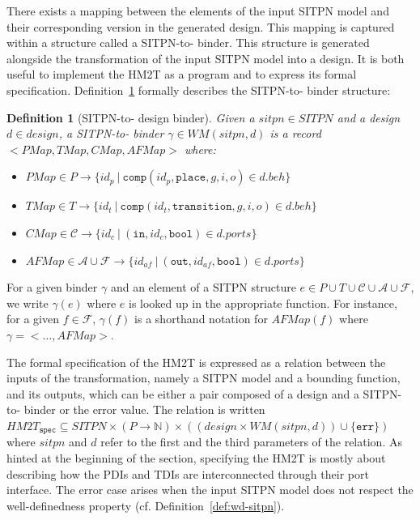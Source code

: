 \documentclass[pdflatex,sn-mathphys]{sn-jnl}%
\theoremstyle{thmstyleone}%
\theoremstyle{thmstyletwo}%
\theoremstyle{thmstylethree}%
\newtheorem{definition}{Definition}%
\begin{document}
There exists a mapping between the elements of the input SITPN model
and their corresponding version in the generated \hvhdl{} design. This
mapping is captured within a structure called a SITPN-to-\hvhdl{}
binder.  This structure is generated alongside the transformation of
the input SITPN model into a \hvhdl{} design. It is both useful to
implement the HM2T as a program and to express its formal
specification. Definition~\ref{def:sitpn-to-hvhdl-binder} formally
describes the SITPN-to-\hvhdl{} binder structure:
\begin{definition}[SITPN-to-\hvhdl{} design binder]
  \label{def:sitpn-to-hvhdl-binder}
  Given a $sitpn\in{}SITPN$ and a \hvhdl{} design $d\in{}design$, a
  SITPN-to-\hvhdl{} binder $\gamma\in{}WM(sitpn,d)$ is a record
  ${<}PMap,TMap,CMap,AFMap{>}$ where:
  \begin{itemize}
  \item $PMap\in{}P\rightarrow{}\{id_p~|~\mathtt{comp}(id_p,\mathtt{place},g,i,o)\in{}d.beh\}$
  \item $TMap\in{}T\rightarrow{}\{id_t~|~\mathtt{comp}(id_t,\mathtt{transition},g,i,o)\in{}d.beh\}$
  \item $CMap\in\mathcal{C}\rightarrow\{id_c~|~(\mathtt{in}, id_c, \mathtt{bool})\in{}d.ports\}$
  \item $AFMap\in\mathcal{A}\cup\mathcal{F}\rightarrow\{id_{af}~|~(\mathtt{out}, id_{af}, \mathtt{bool})\in{}d.ports\}$
  \end{itemize}
\end{definition}

For a given binder $\gamma$ and an element of a SITPN structure
$e\in{}P\cup{}T\cup\mathcal{C}\cup\mathcal{A}\cup\mathcal{F}$, we
write $\gamma(e)$ where $e$ is looked up in the appropriate
function. For instance, for a given $f\in\mathcal{F}$, $\gamma(f)$ is
a shorthand notation for $AFMap(f)$ where $\gamma={<}\dots,AFMap{>}$.

\bigskip

The formal specification of the HM2T is expressed as a relation
between the inputs of the transformation, namely a SITPN model and a
bounding function, and its outputs, which can be either a pair
composed of a \hvhdl{} design and a SITPN-to-\hvhdl{} binder or the
error value. The relation is written
$HM2T_{\mathtt{spec}}\subseteq{}SITPN\times(P\rightarrow\mathbb{N})\times{}((design\times{}WM(sitpn,d))\cup\{\mathtt{err}\})$
where $sitpn$ and $d$ refer to the first and the third parameters of
the relation. As hinted at the beginning of the section, specifying
the HM2T is mostly about describing how the PDIs and TDIs are
interconnected through their port interface. The error case arises
when the input SITPN model does not respect the well-definedness
property (cf. Definition~\ref{def:wd-sitpn}).
\end{document}
